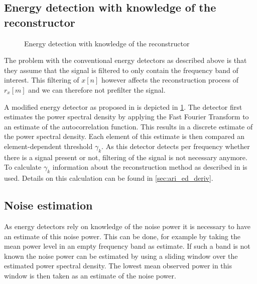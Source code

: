 \documentclass[a4paper, openany, oneside]{memoir}
\begin{document}
\subsection{Energy detection with knowledge of the reconstructor}\label{ssec:ari_ed}
\begin{figure}[H]
\centering
{}
\caption{Energy detection with knowledge of the reconstructor}\label{tkz:ed_ari_overview}
\end{figure}
The problem with the conventional energy detectors as described above is that they assume that the signal is filtered to only contain the frequency band of interest. This filtering of  $x[n]$ however affects the reconstruction process of $r_x[m]$ and we can therefore not prefilter the signal.

A modified energy detector as proposed in \cite{ariananda2012compressive} is depicted in \cref{tkz:ed_ari_overview}. The detector first estimates the power spectral density by applying the Fast Fourier Transform to an estimate of the autocorrelation function. This results in a discrete estimate of the power spectral density. Each element of this estimate is then compared an element-dependent threshold $\gamma_k$. As this detector detects per frequency whether there is a signal present or not, filtering of the signal is not necessary anymore.
To calculate $\gamma_k$ information about the reconstruction method as described in  is used. Details on this calculation can be found in \cref{sec:ari_ed_deriv}.

\subsection{Noise estimation}
As energy detectors rely on knowledge of the noise power it is necessary to have an estimate of this noise power. This can be done,
for example by taking the mean power level in an empty frequency band as estimate. If such a band is not known the noise power can be estimated by using a sliding window over the estimated power spectral density. The lowest mean observed power in this window is then taken
as an estimate of the noise power.
\end{document}

